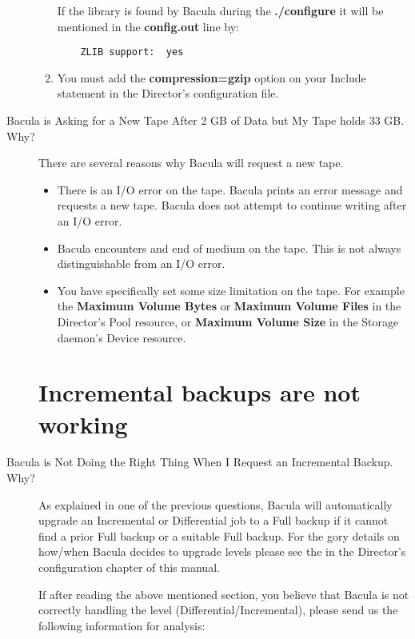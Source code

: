\begin{description}
\begin{enumerate}
   If the library is found by Bacula during the {\bf ./configure} it will
   be mentioned in the {\bf config.out} line by:

\footnotesize
\begin{verbatim}
    ZLIB support:  yes

\end{verbatim}
\normalsize

\item You must add the {\bf compression=gzip} option on your  Include
   statement in the Director's configuration file.
\end{enumerate}

\label{NewTape}
\item [Bacula is Asking for a New Tape After 2 GB of Data but My Tape
   holds 33 GB. Why?]
There are several reasons why Bacula will request a new tape.

\begin{itemize}
\item There is an I/O error on the tape. Bacula prints an error message  and
   requests a new tape. Bacula does not attempt to continue writing  after an
   I/O error.
\item Bacula encounters and end of medium on the tape. This is not always
   distinguishable from an I/O error.
\item You have specifically set some size limitation on the tape. For  example
   the {\bf Maximum Volume Bytes} or {\bf Maximum Volume Files}  in the
   Director's Pool resource, or {\bf Maximum Volume Size} in  the Storage
   daemon's Device resource.
\end{itemize}

\label{LevelChanging}
\section{Incremental backups are not working}
\item [Bacula is Not Doing the Right Thing When I Request an Incremental
   Backup. Why?]
   As explained in one of the previous questions, Bacula will automatically
   upgrade an Incremental or Differential job to a Full backup if it cannot
   find a prior Full backup or a suitable Full backup.  For the gory
   details on how/when Bacula decides to upgrade levels please see the
    in the Director's configuration chapter of
   this manual.

   If after reading the above mentioned section, you believe that Bacula  is not
   correctly handling the level (Differential/Incremental),  please send us the
   following information for analysis:


\end{description}
